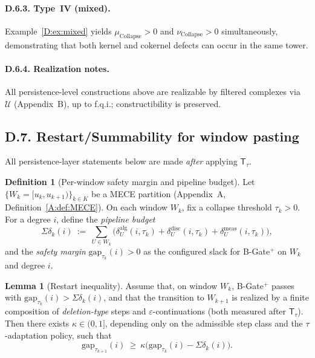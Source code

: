 \documentclass[11pt]{article}
\numberwithin{equation}{section}
\theoremstyle{plain}
\theoremstyle{definition}
\theoremstyle{remark}
\DeclareRobustCommand{\hyp}{\nobreakdash-}
\newcommand{\T}{\mathsf{T}}
\theoremstyle{plain}
\theoremstyle{definition}
\numberwithin{equation}{section}
\newtheorem{lemma}[theorem]{Lemma}
\theoremstyle{definition}
\newtheorem{definition}[theorem]{Definition}
\DeclareRobustCommand{\muc}{\mu_{\mathrm{Collapse}}}
\DeclareRobustCommand{\nuc}{\nu_{\mathrm{Collapse}}}
\numberwithin{equation}{section}
\theoremstyle{plain}
\theoremstyle{definition}
\theoremstyle{remark}
\newcommand{\Ufun}{\mathcal{U}}
\providecommand{\muc}{\mu_{\mathrm{Collapse}}}
\providecommand{\nuc}{\nu_{\mathrm{Collapse}}}
\begin{document}
\paragraph{D.6.3. Type~IV (mixed).}
Example~\ref{D:ex:mixed} yields \(\muc>0\) and \(\nuc>0\) simultaneously, demonstrating that both kernel and cokernel defects can occur in the same tower.

\paragraph{D.6.4. Realization notes.}
All persistence-level constructions above are realizable by filtered complexes via \(\Ufun\) (Appendix~B), up to f.q.i.; constructibility is preserved.

\subsection*{D.7. Restart/Summability for window pasting}\label{subsec:D-restart}

All persistence-layer statements below are made \emph{after} applying \(\T_\tau\).

\begin{definition}[Per-window safety margin and pipeline budget]\label{D:def:window-budget}
Let \(\{W_k=[u_k,u_{k+1})\}_{k\in K}\) be a MECE partition (Appendix~A, Definition~\ref{A:def:MECE}). On each window \(W_k\), fix a collapse threshold \(\tau_k>0\). For a degree \(i\), define the \emph{pipeline budget}
\[
\Sigma\delta_k(i)\ :=\ \sum_{U\in W_k}\Big(\delta^{\mathrm{alg}}_{U}(i,\tau_k)+\delta^{\mathrm{disc}}_{U}(i,\tau_k)+\delta^{\mathrm{meas}}_{U}(i,\tau_k)\Big),
\]
and the \emph{safety margin} \(\mathrm{gap}_{\tau_k}(i)>0\) as the configured slack for B\hyp Gate\(^{+}\) on \(W_k\) and degree \(i\).
\end{definition}

\begin{lemma}[Restart inequality]\label{D:lem:restart}
Assume that, on window \(W_k\), B\hyp Gate\(^{+}\) passes with \(\mathrm{gap}_{\tau_k}(i)>\Sigma\delta_k(i)\), and that the transition to \(W_{k+1}\) is realized by a finite composition of \emph{deletion-type} steps and \(\varepsilon\)\hyp continuations (both measured after \(\T_\tau\)). Then there exists \(\kappa\in(0,1]\), depending only on the admissible step class and the \(\tau\)-adaptation policy, such that
\[
\mathrm{gap}_{\tau_{k+1}}(i)\ \ge\ \kappa\bigl(\mathrm{gap}_{\tau_k}(i)-\Sigma\delta_k(i)\bigr).
\]
\end{lemma}
\end{document}
